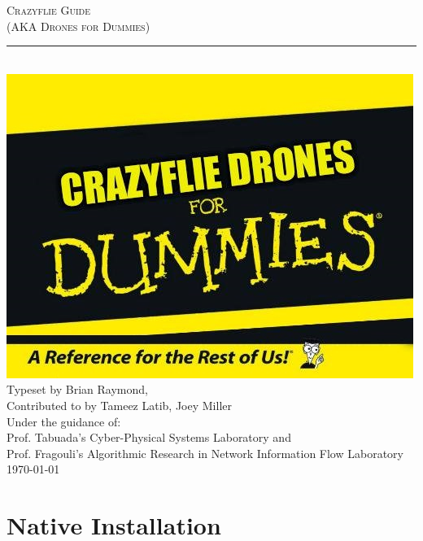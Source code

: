 \documentclass[]{article}
\def\changemargin#1#2{\list{}{\rightmargin#2\leftmargin#1}\item[]}
\newcommand{\docname}{Crazyflie Guide}
\newcommand{\informalname}{Drones for Dummies}
\newcommand{\typesetter}{Brian Raymond}
\newcommand{\contributors}{Tameez Latib, Joey Miller}
\newcommand{\labnames}{Prof. Tabuada's Cyber-Physical Systems Laboratory and \\Prof. Fragouli's Algorithmic Research in Network Information Flow Laboratory}
\begin{document}
	
\begin{titlepage}
	\begin{center}
		{\LARGE \textsc{\docname \\ (AKA \informalname)} \\ \vspace{4pt}}
		\rule[13pt]{\textwidth}{1pt} \\
		\includegraphics[width=1\linewidth]{DronesforDummies.jpg} \\
		{\vspace{1em} \large Typeset by \typesetter,\\ Contributed to by \contributors \\ \vspace{10pt}
			Under the guidance of:\\ \labnames \\ \vspace{10pt}
			\today \\ \vspace{10pt}
		}
	\end{center}
\end{titlepage}



\cleardoublepage
\setcounter{page}{1}

\tableofcontents
\newpage

\changemargin{-1in}{-1in}

\section{Native Installation}
\end{document}
